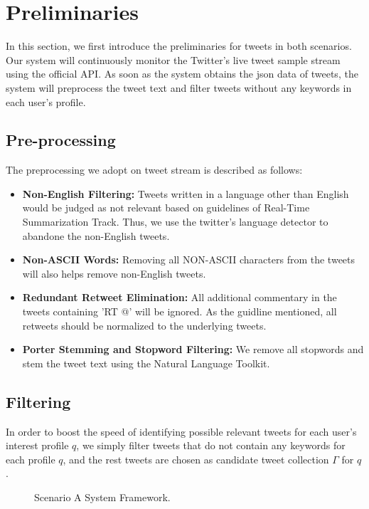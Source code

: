 \section{Preliminaries}
In this section, we first introduce the preliminaries for tweets in both scenarios. Our system will continuously monitor the Twitter's live tweet sample stream using the official API. As soon as the system obtains the json data of tweets, the system will preprocess the tweet text and filter tweets without any keywords in each user's profile.

\subsection{Pre-processing}
The preprocessing we adopt on tweet stream is described as follows:
\begin{itemize}
\item \textbf{Non-English Filtering:} Tweets written in a language other than English would be judged as not relevant based on guidelines of Real-Time Summarization Track. Thus, we use the twitter's language detector to abandone the non-English tweets.
\item \textbf{Non-ASCII Words:} Removing all NON-ASCII characters from the tweets will also helps remove non-English tweets.
\item \textbf{Redundant Retweet Elimination:} All additional commentary in the tweets containing 'RT @' will be ignored. As the guidline mentioned, all retweets should be normalized to the underlying tweets.
\item \textbf{Porter Stemming and Stopword Filtering:} We remove all stopwords and stem the tweet text using the Natural Language Toolkit.
\end{itemize}

\subsection{Filtering}
In order to boost the speed of identifying possible relevant tweets for each user's interest profile $q$, we simply filter tweets that do not contain any keywords for each profile $q$, and the rest tweets are chosen as candidate tweet collection $\Gamma$ for $q$.

\begin{figure}[htbp]
\centering
{
}
\caption{Scenario A System Framework.}
\label{fig:Asys}
\end{figure}
